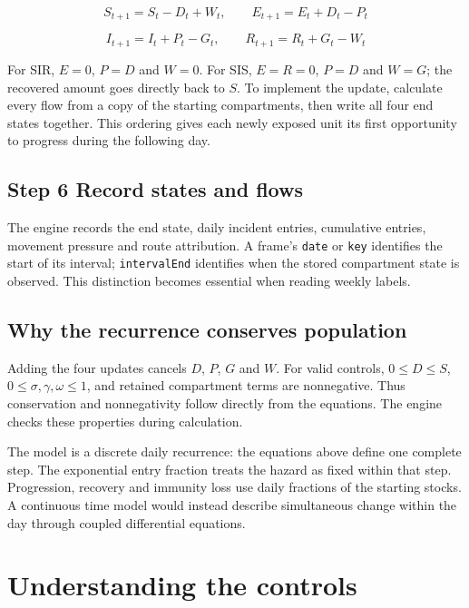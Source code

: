 \documentclass[11pt,a4paper]{article}
\begin{document}
\[
S_{t+1}=S_t-D_t+W_t,\qquad E_{t+1}=E_t+D_t-P_t
\]

\[
I_{t+1}=I_t+P_t-G_t,\qquad R_{t+1}=R_t+G_t-W_t
\]

For SIR, \(E = 0\), \(P = D\) and \(W = 0\). For SIS, \(E = R = 0\),
\(P = D\) and \(W = G\); the recovered amount goes directly back to
\(S\). To implement the update, calculate every flow from a copy of the
starting compartments, then write all four end states together. This
ordering gives each newly exposed unit its first opportunity to progress
during the following day.

\subsection{Step 6 Record states and
flows}\label{step-6-record-states-and-flows}

The engine records the end state, daily incident entries, cumulative
entries, movement pressure and route attribution. A frame's
\nolinkurl{date} or \nolinkurl{key} identifies the start of its
interval; \nolinkurl{intervalEnd} identifies when the stored compartment
state is observed. This distinction becomes essential when reading
weekly labels.

\subsection{Why the recurrence conserves
population}\label{why-the-recurrence-conserves-population}

Adding the four updates cancels \(D\), \(P\), \(G\) and \(W\). For valid
controls, \(0 \leq  D \leq  S\),
\(0 \leq  \sigma , \gamma , \omega  \leq  1\), and retained compartment
terms are nonnegative. Thus conservation and nonnegativity follow
directly from the equations. The engine checks these properties during
calculation.

The model is a discrete daily recurrence: the equations above define one
complete step. The exponential entry fraction treats the hazard as fixed
within that step. Progression, recovery and immunity loss use daily
fractions of the starting stocks. A continuous time model would instead
describe simultaneous change within the day through coupled differential
equations.

\clearpage
\section{Understanding the controls}\label{understanding-the-controls}
\end{document}
